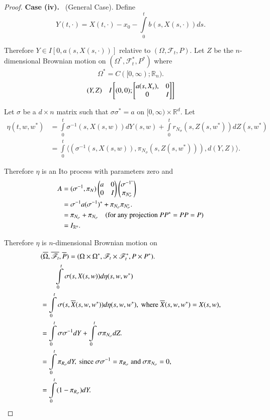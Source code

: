 \begin{proof}
\noindent
{\bf Case (iv).}~ (General Case). Define
$$
Y(t,\cdot)=X(t,\cdot)-x_{0}-\int\limits^{t}_{0}b(s,X(s,\cdot))ds.
$$

Therefore $Y\in I[0,a(s,X(s,\cdot))]$ relative to
$(\Omega,\mathscr{F}_{t},P)$. Let $Z$ be the\pageoriginale
$n$-dimensional Brownian motion on
$(\Omega^{*},\mathscr{F}^{*}_{t},P^{*})$ where
$$
\Omega^{*}=C([0,\infty);\mathbb{R}_{n}).
$$ 
$$
(Y,Z)\quad I\left[(0,0);
\begin{bmatrix}
a(s,X_{s}), & 0\\
0 & I
\end{bmatrix}
\right]
$$

Let $\sigma$ be a $d\times n$ matrix such that $\sigma\sigma^{*}=a$ on
$[0,\infty)\times \mathbb{R}^{d}$. Let
\begin{align*}
\eta(t,w,w^{*}) &=
\int\limits^{t}_{0}\sigma^{-1}(s,X(s,w))dY(s,w)+\int\limits^{t}_{0}r_{N_{\sigma}}(s,Z(s,w^{*}))dZ(s,w^{*})\\
&= \int\limits^{t}_{0}\langle
(\sigma^{-1}(s,X(s,w)),\pi_{N_{\sigma}}(s,Z(s,w^{*}))), d(Y,Z)\rangle.
\end{align*}

Therefore $\eta$ is an Ito process with parameters zero and
\begin{align*}
A &= (\sigma^{-1},\pi_N)
\begin{pmatrix}
a & 0\\
0 & I
\end{pmatrix}
\begin{pmatrix}
\sigma^{-1^{*}}\\
\pi_{N^{*}_{\sigma}}
\end{pmatrix}\\
&=
\sigma^{-1}a(\sigma^{-1})^{*}+\pi_{N_{\sigma}}\pi_{N^{*}_{\sigma}}.\\
&= \pi_{N_{\sigma}}+\pi_{N_{\sigma}}\quad\text{(for any projection
  $PP^{*}=PP=P$)}\\
&= I_{\mathbb{R}^{n}}.
\end{align*}

Therefore $\eta$ is $n$-dimensional Brownian motion on
\begin{align*}
&
  (\overline{\Omega},\overline{\mathscr{F}_{t}},\overline{P})=(\Omega\times
    \Omega^{*},\mathscr{F}_{t}\times \mathscr{F}^{*}_{t},P\times
    P^{*}).\\
&\qquad \int\limits^{t}_{0}\sigma(s,X(s,w))d\eta(s,w,w^{*})\\
&=
    \int\limits^{t}_{0}\sigma(s,\overline{X}(s,w,w^{*}))d\eta(s,w,w^{*}),\text{~
      where~ }\overline{X}(s,w,w^{*})=X(s,w),\\
&=
    \int\limits^{t}_{0}\sigma\sigma^{-1}dY+\int\limits^{t}_{0}\sigma\pi_{N_{\sigma}}dZ.\\
&= \int\limits^{t}_{0}\pi_{R_{\sigma}}dY,\text{~ since~ }
    \sigma\sigma^{-1}=\pi_{R_{\sigma}}\text{~ and~ }
    \sigma\pi_{N_{\sigma}}=0,\\
&= \int\limits^{t}_{0}(1-\pi_{R_{\sigma}})dY.
\end{align*}\pageoriginale
\end{proof}

